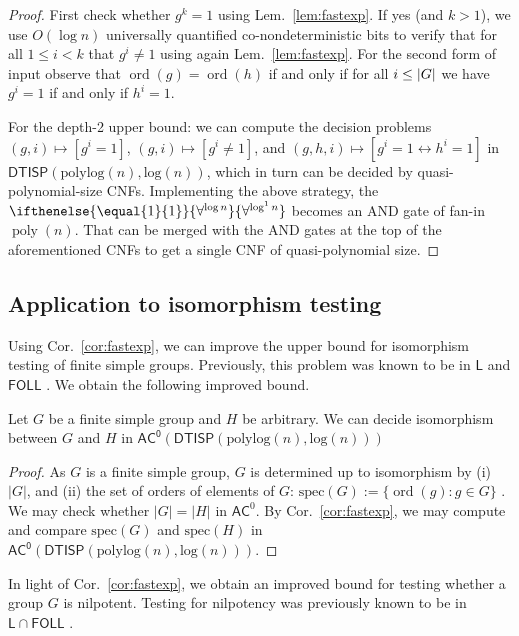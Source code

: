 \documentclass{article}
\newcommand{\ord}[1]{\operatorname{ord}(#1)}
\newcommand{\alphacc}[1]{\ifthenelse{\equal{#1}{1}}{\forall^{\log n}}{\forall^{\log^{#1}n}}} %
\newcommand{\abs}[1]{\left|\mathinner{#1}\right|}
\newcommand{\Lem}[1]{Lem.~\ref{#1}\xspace}
\newcommand{\Cor}[1]{Cor.~\ref{#1}\xspace}
\DeclareMathOperator{\poly}{poly}
\newcommand*{\ComplexityClass}[1]{\ensuremath{\mathsf{#1}}\xspace}
\newcommand{\DTISP}{\ComplexityClass{DTISP}}
\newcommand{\DTISPpll}{\ensuremath{\DTISP(\mathrm{polylog}(n),\mathrm{log}(n))}\xspace}
\newcommand*{\LogSpace}{\ComplexityClass{L}}
\newcommand{\AC}{\ComplexityClass{AC}}
\newcommand{\ACz}{\ComplexityClass{AC^0}}
\begin{document}
\begin{proof}
First check whether $g^k = 1$ using \Lem{lem:fastexp}. If yes (and $k > 1$), we use $O(\log n)$ universally quantified co-nondeterministic bits to verify that for all $1 \leq i < k$ that $g^{i} \neq 1$ using again  \Lem{lem:fastexp}. For the second form of input observe that $\ord{g} = \ord{h}$ if and only if for all $i \leq \abs{G}$ we have $g^i = 1$ if and only if $h^i=1$. 

For the depth-2 upper bound: we can compute the decision problems $(g,i) \mapsto [g^i = 1]$, $(g,i) \mapsto [g^i \neq 1]$, and $(g,h,i) \mapsto [g^i=1 \leftrightarrow h^i=1]$ in $\DTISPpll$, which in turn can be decided by quasi-polynomial-size CNFs. Implementing the above strategy, the $\alphacc{1}$ becomes an AND gate of fan-in $\poly(n)$. That can be merged with the AND gates at the top of the aforementioned CNFs to get a single CNF of quasi-polynomial size. \qedhere
\end{proof}

\subsection{Application to isomorphism testing}
Using \Cor{cor:fastexp}, we can improve the upper bound for isomorphism testing of finite simple groups. Previously, this problem was known to be in $\LogSpace$ \cite{TangThesis} and $\mathsf{FOLL}$ \cite{GrochowLevetWL}. We obtain the following improved bound.

\begin{corollary} \label{cor:simple}
Let $G$ be a finite simple group and $H$ be arbitrary. We can decide isomorphism between $G$ and $H$ in $\ACz(\DTISPpll)$ 
\end{corollary}

\begin{proof}
 As $G$ is a finite simple group, $G$ is determined up to isomorphism by (i) $|G|$, and (ii) the set of orders of elements of $G$: $\text{spec}(G) := \{ \ord{g} : g \in G \}$ \cite{SimpleOrder}. We may check whether $|G| = |H|$ in $\AC^{0}$. By \Cor{cor:fastexp}, we may compute and compare $\text{spec}(G)$ and $\text{spec}(H)$ in $\ACz(\DTISPpll)$. \qedhere 
\end{proof}


In light of \Cor{cor:fastexp}, we obtain an improved bound for testing whether a group $G$ is nilpotent. Testing for nilpotency was previously known to be in  $\LogSpace \cap \mathsf{FOLL}$ \cite{BKLM}.
\end{document}
